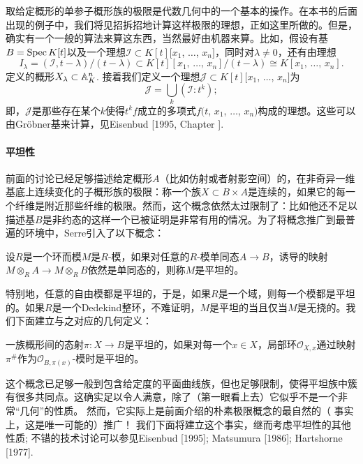 取给定概形的单参子概形族的极限是代数几何中的一个基本的操作。在本书的后面出现的例子中，我们将见招拆招地计算这样极限的理想，正如这里所做的。但是，确实有一个一般的算法来算这东西，当然最好由机器来算。比如，假设有基$B=\operatorname{Spec} K[t]$以及一个理想$\mathscr{I}\subset K[t][x_1$, $\dots$, $x_n]$，同时对$\lambda \neq 0$，还有由理想
\[
	I_\lambda=(\mathscr{I},t-\lambda)/(t-\lambda)\subset K[t][\text{$x_1$, $\dots$, $x_n$}]/(t-\lambda)\cong K[\text{$x_1$, $\dots$, $x_n$}].
\]
定义的概形$X_\lambda\subset \mathbb{A}_K^n$. 接着我们定义一个理想$\mathscr{J}\subset K[t][x_1$, $\dots$, $x_n]$为
\[
	\mathscr{J}=\bigcup_k (\mathscr{I}:t^k);
\]
即，$\mathscr{J}$是那些存在某个$k$使得$t^k f$成立的多项式$f(t$, $x_1$, $\dots$, $x_n)$构成的理想。这些可以由Gr\"{o}bner基来计算，见Eisenbud [1995, Chapter \uppercase\expandafter{}].

\paragraph*{平坦性}
前面的讨论已经足够描述给定概形$A$（比如仿射或者射影空间）的，在非奇异一维基底上连续变化的子概形族的极限：称一个族$X\subset B\times A$是连续的，如果它的每一个纤维是附近那些纤维的极限。然而，这个概念依然太过限制了：比如他还不足以描述基$B$是非约态的这样一个已被证明是非常有用的情况。为了将概念推广到最普遍的环境中，Serre引入了以下概念：

\begin{defi}
	设$R$是一个环而模$M$是$R$\hyp 模，如果对任意的$R$\hyp 模单同态$A\to B$，诱导的映射$M\otimes_R A\to M\otimes_R B$依然是单同态的，则称$M$是平坦的。
\end{defi}

特别地，任意的自由模都是平坦的，于是，如果$R$是一个域，则每一个模都是平坦的。如果$R$是一个Dedekind整环，不难证明，$M$是平坦的当且仅当$M$是无挠的。我们下面建立与之对应的几何定义：

\begin{defi}
	一族概形间的态射$\pi:X\to B$是平坦的，如果对每一个$x\in X$，局部环$\mathscr{O}_{X,x}$通过映射$\pi^\#$作为$\mathscr{O}_{B,\pi(x)}$\hyp 模时是平坦的。
\end{defi}

这个概念已足够一般到包含给定度的平面曲线族，但也足够限制，使得平坦族中簇有很多共同点。这确实足以令人满意，除了（第一眼看上去）它似乎不是一个非常“几何”的性质。 然而，它实际上是前面介绍的朴素极限概念的最自然的（ 事实上，这是唯一可能的）推广！ 我们下面将建立这个事实，继而考虑平坦性的其他性质; 不错的技术讨论可以参见Eisenbud [1995]; Matsumura [1986]; Hartshorne [1977]. 

